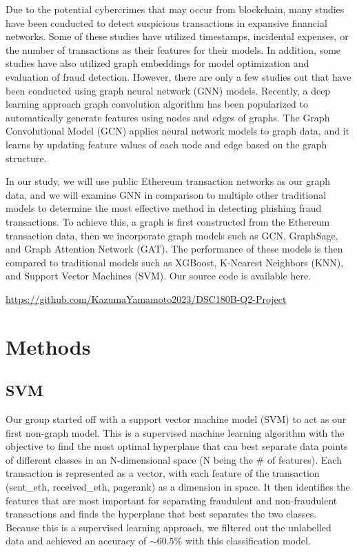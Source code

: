 \documentclass{article}
\begin{document}
	Due to the potential cybercrimes that may occur from blockchain, many studies have been conducted to detect suspicious transactions in expansive financial networks. Some of these studies have utilized timestamps, incidental expenses, or the number of transactions as their features for their models. In addition, some studies have also utilized graph embeddings for model optimization and evaluation of fraud detection. However, there are only a few studies out that have been conducted using graph neural network (GNN) models. Recently, a deep learning approach graph convolution algorithm has been popularized to automatically generate features using nodes and edges of graphs. The Graph Convolutional Model (GCN) applies neural network models to graph data, and it learns by updating feature values of each node and edge based on the graph structure. 


In our study, we will use public Ethereum transaction networks as our graph data, and we will examine GNN in comparison to multiple other traditional models to determine the most effective method in detecting phishing fraud transactions. To achieve this, a graph is first constructed from the Ethereum transaction data, then we incorporate graph models such as GCN, GraphSage, and Graph Attention Network (GAT). The performance of these models is then compared to traditional models such as XGBoost, K-Nearest Neighbors (KNN), and Support Vector Machines (SVM). Our source code is available here. 
	
\begin{center}
\url{https://github.com/KazumaYamamoto2023/DSC180B-Q2-Project}
\end{center}


\section{Methods}

\subsection{SVM}
    Our group started off with a support vector machine model (SVM) to act as our first non-graph model. This is a supervised machine learning algorithm with the objective to find the most optimal hyperplane that can best separate data points of different classes in an N-dimensional space (N being the \# of features). Each transaction is represented as a vector, with each feature of the transaction (sent\_eth, received\_eth, pagerank) as a dimension in space. It then identifies the features that are most important for separating fraudulent and non-fraudulent transactions and finds the hyperplane that best separates the two classes. Because this is a supervised learning approach, we filtered out the unlabelled data and achieved an accuracy of $\sim$$60.5\%$ with this classification model. 
\end{document}
